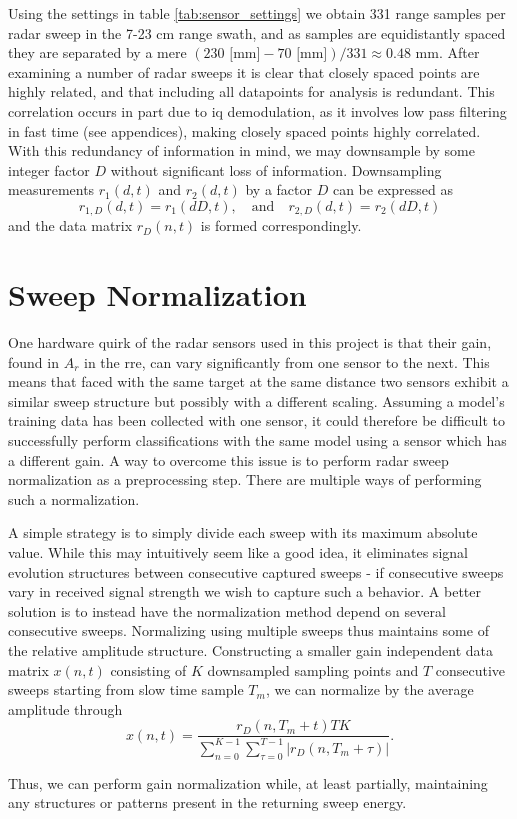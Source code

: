 Using the settings in table \ref{tab:sensor_settings} we obtain 331 range samples per radar sweep in the 7-23 cm range swath, and as samples are equidistantly spaced they are separated by a mere $(230 \text{ [mm]}-70\text{ [mm]})/331\approx0.48$ mm. After examining a number of radar sweeps it is clear that closely spaced points are highly related, and that including all datapoints for analysis is redundant. This correlation occurs in part due to \gls{iq} demodulation, as it involves low pass filtering in fast time (see appendices), making closely spaced points highly correlated. With this redundancy of information in mind, we may downsample by some integer factor $D$ without significant loss of information. Downsampling measurements $r_1(d,t)$ and $r_2(d,t)$ by a factor $D$ can be expressed as
\begin{equation}
	\label{eq:downsamp}
	r_{1,D}(d, t) = r_{1}(dD,t),
	\quad \text{and} \quad r_{2,D}(d,t) = r_{2}(dD,t)
\end{equation}
and the data matrix $r_D(n,t)$ is formed correspondingly.

\section{Sweep Normalization}\label{sec:norm}

One hardware quirk of the radar sensors used in this project is that their gain, found in $A_r$ in the \gls{rre}, can vary significantly from one sensor to the next. This means that faced with the same target at the same distance two sensors exhibit a similar sweep structure but possibly with a different scaling. Assuming a model's training data has been collected with one sensor, it could therefore be difficult to successfully perform classifications with the same model using a sensor which has a different gain. A way to overcome this issue is to perform radar sweep normalization as a preprocessing step. There are multiple ways of performing such a normalization. %

A simple strategy is to simply divide each sweep with its maximum absolute value. While this may intuitively seem like a good idea, it eliminates signal evolution structures between consecutive captured sweeps - if consecutive sweeps vary in received signal strength we wish to capture such a behavior. A better solution is to instead have the normalization method depend on several consecutive sweeps. Normalizing using multiple sweeps thus maintains some of the relative amplitude structure. Constructing a smaller gain independent data matrix $x(n,t)$ consisting of $K$ downsampled sampling points and $T$ consecutive sweeps starting from slow time sample $T_m$, we can normalize by the average amplitude through
\begin{equation}
	x(n,t) = 
	\frac{r_D(n, T_m + t)TK}{\sum_{n=0}^{K-1}\sum_{\tau=0}^{T-1}|r_D(n, T_m+\tau)|}.
\end{equation}

Thus, we can perform gain normalization while, at least partially, maintaining any structures or patterns present in the returning sweep energy. 

